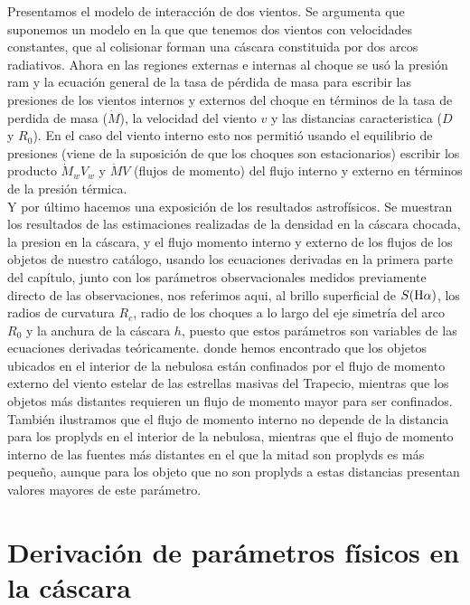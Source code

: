 Presentamos el modelo de interacción de dos vientos. Se argumenta que suponemos un modelo en la que que tenemos dos vientos con velocidades constantes, que al colisionar forman una cáscara constituida por dos arcos radiativos.  Ahora  en las regiones externas e internas al choque se usó la presión ram y la ecuación general de la tasa de pérdida de masa para escribir las  presiones de los vientos internos y externos del choque en términos de la tasa de perdida de masa (\(\dot{M}\)), la velocidad del viento \(v\) y las distancias caracteristica (\(D\) y \(R_{0}\)). En el caso del viento interno esto nos permitió  usando el equilibrio de presiones (viene de la suposición de que los choques son estacionarios) escribir los producto  \(\dot{M}_{w}V_{w}\) y \(\dot{M}V\) (flujos de momento) del flujo interno y externo en términos de la presión térmica.\\

Y por último hacemos una  exposición de los resultados astrofísicos. Se muestran los resultados de las estimaciones realizadas de la densidad en la cáscara chocada, la presion en la cáscara,  y el flujo momento interno y externo de los flujos de los objetos de nuestro catálogo, usando los ecuaciones derivadas en la primera parte del capítulo, junto con los parámetros observacionales medidos previamente directo de las observaciones, nos referimos aqui, al brillo superficial de \ha{}  \(S(\mathrm{H}\alpha{})\), los radios de curvatura \(R_{c}\), radio de los choques a lo largo del eje simetría del arco \(R_{0}\) y la anchura de la cáscara \(h\), puesto que estos parámetros son variables de las ecuaciones derivadas teóricamente. donde hemos encontrado que los objetos ubicados en el interior de la nebulosa están confinados por el flujo de momento externo  del viento estelar de las estrellas masivas del Trapecio, mientras que los objetos más distantes requieren un flujo de momento mayor para ser confinados. También ilustramos que el flujo de momento interno no depende de la distancia para los proplyds en el interior de la nebulosa, mientras que el flujo de momento interno de las fuentes más distantes en el que la mitad son proplyds es más pequeño, aunque para los objeto que no son proplyds a estas distancias presentan valores mayores de este parámetro. 

\section{Derivación de parámetros físicos en la cáscara}
\label{sec:phy}

